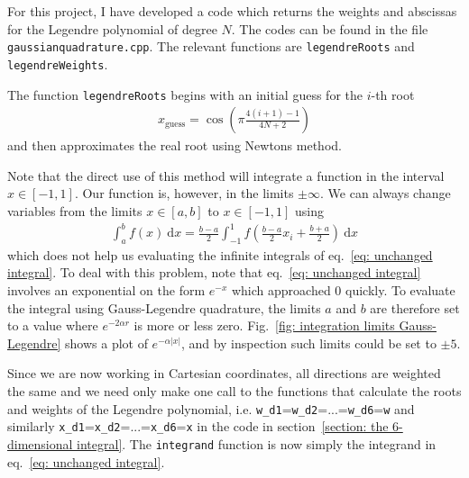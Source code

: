 \documentclass[twoside, 11pt]{article}
\renewcommand{\d}{\mathrm{d}}
\begin{document}
			For this project, I have developed a code which returns the weights and  abscissas for the Legendre polynomial of degree $N$. The codes can be found in the file \texttt{gaussianquadrature.cpp}. The relevant functions are \texttt{legendreRoots} and \texttt{legendreWeights}.
			
			The function \texttt{legendreRoots} begins with an initial guess for the $i$-th root 
			\begin{align*}
				x_\mathrm{guess} = \cos \left( \pi \frac{4(i+1) - 1}{4N + 2} \right) 
			\end{align*}
			and then approximates the real root using Newtons method. 
			
			
			Note that the direct use of this method will integrate a function in the interval $x\in[-1,1]$. Our function is, however, in the limits $\pm \infty$. We can always change variables from the limits $x \in [a, b]$ to $x \in [-1, 1]$ using
			\begin{align}
				\int_{a}^{b} f(x) \ \d x = \frac{b-a}{2} \int_{-1}^{1} f\left( \frac{b-a}{2}x_i + \frac{b+a}{2} \right) \ \d x
			\end{align}
			which does not help us evaluating the infinite integrals of eq.~\eqref{eq: unchanged integral}. To deal with this problem, note that eq.~\eqref{eq: unchanged integral} involves an exponential on the form $e^{-x}$ which approached 0 quickly. To evaluate the integral using Gauss-Legendre quadrature, the limits $a$ and $b$ are therefore set to a value where $e^{-2\alpha r}$ is more or less zero. Fig.~\ref{fig: integration limits Gauss-Legendre} shows a plot of $e^{-\alpha |x|}$, and by inspection such limits could be set to $\pm 5$. 
			
			Since we are now working in Cartesian coordinates, all directions are weighted the same and we need only make one call to the functions that calculate the roots and weights of the Legendre polynomial, i.e. \texttt{w\_d1}=\texttt{w\_d2}=...=\texttt{w\_d6}=\texttt{w} and similarly  \texttt{x\_d1}=\texttt{x\_d2}=...=\texttt{x\_d6}=\texttt{x} in the code in section~\ref{section: the 6-dimensional integral}. The \texttt{integrand} function is now simply the integrand in eq.~\eqref{eq: unchanged integral}.
			
\end{document}
